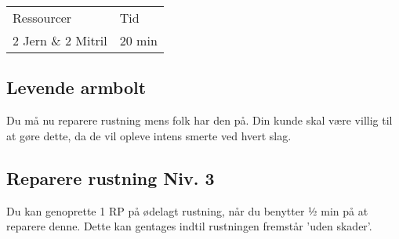 \begin{table}[H]
    \centering
    \begin{tabular}{|p{}|p{}|}
    \hline
    \rowcolor{cerulean!80}
    \multicolumn{2}{c}{Lås Niv. 3}\\
    \hline
    \rowcolor{cerulean!40}
         Ressourcer & Tid \\\hline
         2 Jern \& 2 Mitril & 20 min\\\hline
    \end{tabular}
    \end{table}
    
\subsection*{Levende armbolt}
Du må nu reparere rustning mens folk har den på. Din kunde skal være villig til at gøre dette, da de vil opleve intens smerte ved hvert slag.

\subsection*{Reparere rustning Niv. 3}
Du kan genoprette 1 RP på ødelagt rustning, når du benytter ½ min på at reparere denne. Dette kan gentages indtil rustningen fremstår 'uden skader'.\\

